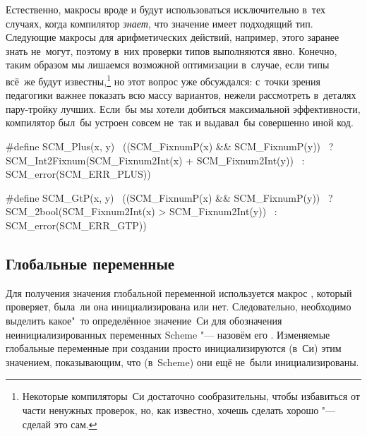 Естественно, макросы вроде  и  будут использоваться
исключительно в~тех случаях, когда компилятор \emph{знает}, что значение имеет
подходящий тип. Следующие макросы для арифметических действий, например, этого
заранее знать не~могут, поэтому в~них проверки типов выполняются явно. Конечно,
таким образом мы лишаемся возможной оптимизации в~случае, если типы всё~же
будут известны,\footnote*{Некоторые компиляторы~Си достаточно сообразительны,
чтобы избавиться от части ненужных проверок, но, как известно, хочешь сделать
хорошо "--- сделай это сам.} но этот вопрос уже обсуждался: с~точки зрения
педагогики важнее показать всю массу вариантов, нежели рассмотреть в~деталях
пару-тройку лучших. Если~бы мы хотели добиться максимальной эффективности,
компилятор был~бы устроен совсем не~так и выдавал~бы совершенно иной код.

\begin{code:c}
#define SCM_Plus(x, y)                                     \
  ((SCM_FixnumP(x) && SCM_FixnumP(y))                      \
   ? SCM_Int2Fixnum(SCM_Fixnum2Int(x) + SCM_Fixnum2Int(y)) \
   : SCM_error(SCM_ERR_PLUS))

#define SCM_GtP(x, y)                                      \
  ((SCM_FixnumP(x) && SCM_FixnumP(y))                      \
   ? SCM_2bool(SCM_Fixnum2Int(x) > SCM_Fixnum2Int(y))      \
   : SCM_error(SCM_ERR_GTP))
\end{code:c}


\subsection{Глобальные переменные}\label{cc/data/ssect:global}

Для получения значения глобальной переменной используется макрос
, который проверяет, была~ли она
инициализирована или нет. Следовательно, необходимо выделить какое"~то
определённое значение~Си для обозначения неинициализированных переменных Scheme
"--- назовём его . Изменяемые
глобальные переменные при создании просто инициализируются (в~Си) этим
значением, показывающим, что (в~Scheme) они ещё не~были инициализированы.

